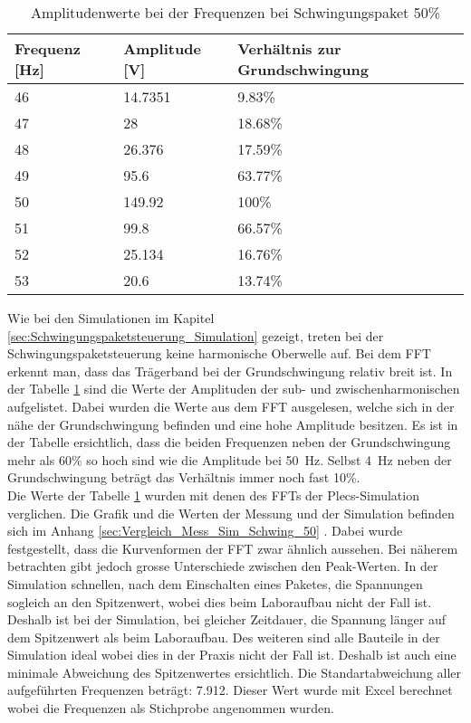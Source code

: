 \newpage
\begin{table}[ht!]
	\centering
	\begin{tabular}{|l|l|l|}
		\hline
		Frequenz {[}Hz{]} & Amplitude {[}V{]} & Verhältnis zur Grundschwingung \\ \hline
		46                & 14.7351           & 9.83\%                         \\ \hline
		47                & 28                & 18.68\%                        \\ \hline
		48                & 26.376            & 17.59\%                        \\ \hline
		49                & 95.6              & 63.77\%                        \\ \hline
		50                & 149.92            & 100\%                          \\ \hline
		51                & 99.8              & 66.57\%                        \\ \hline
		52                & 25.134            & 16.76\%                        \\ \hline
		53                & 20.6              & 13.74\%                        \\ \hline
	\end{tabular}
\caption{Amplitudenwerte bei der Frequenzen bei Schwingungspaket 50\%}\label{tab:Mess_Spannung_Schwing_50}
\end{table}
Wie bei den Simulationen im Kapitel \ref{sec:Schwingungspaketsteuerung_Simulation} gezeigt, treten bei der Schwingungspaketsteuerung keine harmonische Oberwelle auf. Bei dem FFT erkennt man, dass das Trägerband bei der Grundschwingung relativ breit ist. In der Tabelle \ref{tab:Mess_Spannung_Schwing_50} sind die Werte der Amplituden der sub- und zwischenharmonischen aufgelistet. Dabei wurden die Werte aus dem FFT ausgelesen, welche sich in der nähe der Grundschwingung befinden und eine hohe Amplitude besitzen. 
Es ist in der Tabelle ersichtlich, dass die beiden Frequenzen neben der Grundschwingung mehr als 60\% so hoch sind wie die Amplitude bei \SI{50}{Hz}. Selbst \SI{4}{Hz} neben der Grundschwingung beträgt das Verhältnis immer noch fast 10\%.\\
Die Werte der Tabelle \ref{tab:Mess_Spannung_Schwing_50} wurden mit denen des FFTs der Plecs-Simulation verglichen. Die Grafik und die Werten der Messung und der Simulation befinden sich im Anhang \ref{sec:Vergleich_Mess_Sim_Schwing_50} . Dabei wurde festgestellt, dass die Kurvenformen der FFT zwar ähnlich aussehen. Bei näherem betrachten gibt jedoch grosse Unterschiede zwischen den Peak-Werten. In der Simulation schnellen, nach dem Einschalten eines Paketes, die Spannungen sogleich an den Spitzenwert, wobei dies beim Laboraufbau nicht der Fall ist. Deshalb ist bei der Simulation, bei gleicher Zeitdauer, die Spannung länger auf dem Spitzenwert als beim Laboraufbau. Des weiteren sind alle Bauteile in der Simulation ideal wobei dies in der Praxis nicht der Fall ist. Deshalb ist auch eine minimale Abweichung des Spitzenwertes ersichtlich. Die Standartabweichung aller aufgeführten Frequenzen beträgt: 7.912. Dieser Wert wurde mit Excel berechnet wobei die Frequenzen als Stichprobe angenommen wurden. 

